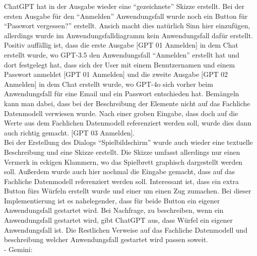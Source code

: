 ChatGPT hat in der Ausgabe wieder eine ``gezeichnete'' Skizze erstellt. Bei der ersten Ausgabe für den ``Anmelden'' Anwendungsfall wurde
noch ein Button für ``Passwort vergessen?'' erstellt. Ansich macht dies natürlich Sinn hier einzufügen, allerdings wurde im Anwendungsfalldiagramm
kein Anwendungsfall dafür erstellt. Positiv auffällig ist, dass die erste Ausgabe [GPT 01 Anmelden] in dem Chat erstellt wurde, wo GPT-3.5 
den Anwendungsfall ``Anmelden'' erstellt hat und dort festgelegt hat, dass sich der User mit einem Benutzernamen und einem Passwort anmeldet [GPT 01 Anmelden]
und die zweite Ausgabe [GPT 02 Anmelden] in dem Chat erstellt wurde, wo GPT-4o sich vorher beim Anwendungsfall für eine Email und ein Passwort 
entschieden hat. Bemängeln kann man dabei, dass bei der Beschreibung der Elemente nicht auf das Fachliche Datenmodell verwiesen wurde. Nach einer 
groben Eingabe, dass doch auf die Werte aus dem Fachlichen Datenmodell referenziert werden soll, wurde dies dann auch richtig gemacht. [GPT 03 Anmelden].\\
Bei der Erstellung des Dialogs ``Spielbildschirm'' wurde auch wieder eine textuelle Beschreibung und eine Skizze erstellt. Die Skizze umfasst
allerdings nur einen Vermerk in eckigen Klammern, wo das Spielbrett graphisch dargestellt werden soll. Außerdem wurde auch hier nochmal die Eingabe 
gemacht, dass auf das Fachliche Datenmodell referenziert werden soll. Interessant ist, dass ein extra Button fürs Würfeln erstellt wurde und einer um 
einen Zug zumachen. Bei dieser Implementierung ist es nahelegender, dass für beide Button ein eigener Anwendungsfall gestartet wird. Bei Nachfrage, zu 
beschreiben, wenn ein Anwendungsfall gestartet wird, gibt ChatGPT aus, dass Würfel ein eigener Anwendungsfall ist. Die Restlichen Verweise auf das 
Fachliche Datenmodell und beschreibung welcher Anwendungsfall gestartet wird passen soweit.\\

- Gemini:


